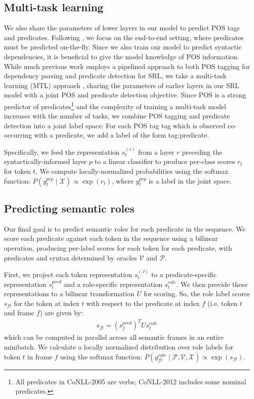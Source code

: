 \documentclass[11pt,a4paper]{article}
\begin{document}
\subsection{Multi-task learning \label{sec:MTL}}
We also share the parameters of lower layers in our model to predict POS tags and predicates. Following \citet{he2017deep}, we focus on the end-to-end setting, where predicates must be predicted on-the-fly. Since we also train our model to predict syntactic dependencies, it is beneficial to give the model knowledge of POS information. While much previous work employs a pipelined approach to both POS tagging for dependency parsing and predicate detection for SRL, we take a multi-task learning (MTL) approach \citep{caruana1993multitask}, sharing the parameters of earlier layers in our SRL model with a joint POS and predicate detection objective. Since POS is a strong predictor of predicates\footnote{All predicates in CoNLL-2005 are verbs; CoNLL-2012 includes some nominal predicates.} 
and the complexity of training a multi-task model increases with the number of tasks, we combine POS tagging and predicate detection into a joint label space: For each POS tag {\sc tag} which is observed co-occurring with a predicate, we add a label of the form {\sc tag:predicate}.

Specifically, we feed the representation $s_t^{(r)}$ from a layer $r$ preceding the syntactically-informed layer $p$ to a linear classifier to produce per-class scores $r_t$ for token $t$. We compute locally-normalized probabilities using the softmax function: $P(y_t^{prp} \mid \mathcal{X}) \propto \exp(r_t)$, where $y_t^{prp}$ is a label in the joint space. 


\subsection{Predicting semantic roles \label{sec:srl}}
Our final goal is to predict semantic roles for each predicate in the sequence. We score each predicate
against each token in the sequence using a bilinear operation, producing per-label scores for each token for each predicate, with predicates and syntax determined by oracles $\mathcal{V}$ and $\mathcal{P}$. 

First, we project each token representation $s_t^{(J)}$ to a predicate-specific representation $s_t^{pred}$ and a role-specific representation $s_t^{role}$.
We then provide these representations to a bilinear transformation $U$ for scoring. So, the role label scores $s_{ft}$ for the token at index $t$ with respect to the predicate at index $f$ (i.e. token $t$ and frame $f$) are given by:
\begin{align}
\label{eqn:bilinear}
s_{ft} = (s_f^{pred})^T U s_t^{role}
\end{align}
which can be computed in parallel across all semantic frames in an entire minibatch. We calculate a locally normalized distribution over role labels for token $t$ in frame $f$ using the softmax function: $P(y_{ft}^{role}\mid \mathcal{P},\mathcal{V}, \mathcal{X}) \propto \exp(s_{ft})$.
\end{document}
